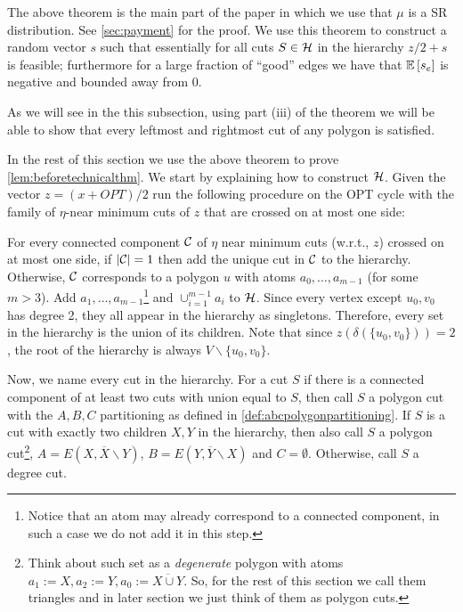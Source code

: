The above theorem is the main part of the paper in which we use that $\mu$ is a SR distribution. See \cref{sec:payment} for the proof. We use this theorem to construct a random vector $s$ such that essentially for all cuts $S\in\mathcal{H}$ in the hierarchy $z/2+s$ is feasible; furthermore for a large fraction of ``good'' edges we have that ${\mathbb{E}}\left[s_e\right]$ is negative and bounded away from $0$. 

As we will see in the this subsection, using part (iii) of the theorem we will be able to show that every leftmost and rightmost cut of any polygon is satisfied.



In the rest of this section we use the above theorem to prove \cref{lem:beforetechnicalthm}. 
We start by explaining how to construct $\mathcal{H}$.
Given the vector $z=(x+OPT)/2$ run the following procedure on the OPT cycle with  the family of $\eta$-near minimum cuts of $z$ that are crossed on at most one side:

For every connected component ${\cal C}$ of $\eta$ near minimum cuts (w.r.t., $z$) crossed on at most one side, if $|{\cal C}|=1$ then add the unique cut in ${\cal C}$ to the hierarchy. Otherwise, ${\cal C}$ corresponds to a polygon $u$ with atoms $a_0,\dots,a_{m-1}$ (for some $m>3$). Add $a_1,\dots,a_{m-1}$\footnote{Notice that an atom may already correspond to a connected component, in such a case we do not add it in this step.} and $\cup_{i=1}^{m-1} a_i$ to $\mathcal{H}$. Since every vertex except $u_0,v_0$ has degree 2, they all appear in the hierarchy as singletons. Therefore, every set in the hierarchy is the union of its children. 
Note that since $z(\delta(\{u_0,v_0\}))=2$, the root of the hierarchy is always $V\smallsetminus \{u_0,v_0\}$.


Now, we name every cut  in the hierarchy.
For a cut $S$ if there is a connected component of at least two cuts  with union equal to $S$, then call $S$  a polygon cut with the $A,B,C$ partitioning as defined in \cref{def:abcpolygonpartitioning}.
If $S$ is a cut with exactly two children $X,Y$ in the hierarchy, then also call $S$ a polygon cut\footnote{Think about such set as a {\em degenerate} polygon with atoms $a_1:= X,a_2:= Y,a_0 :=\overline{X\cup Y}$. So, for the rest of this section we call them triangles and in later section we just think of them as polygon cuts.}, $A=E(X,\overline{X}\smallsetminus Y)$, $B=E(Y,\overline{Y}\smallsetminus X)$ and $C=\emptyset$.
Otherwise, call $S$ a degree cut.


